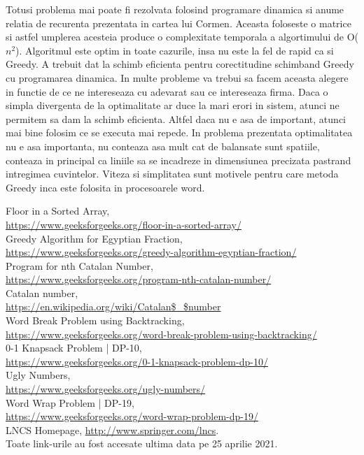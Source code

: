 \documentclass[runningheads]{llncs}
\begin{document}
Totusi problema mai poate fi rezolvata folosind programare dinamica si anume relatia de recurenta prezentata in
cartea lui Cormen. Aceasta foloseste o matrice si astfel umplerea acesteia produce o complexitate temporala a algortimului de O($n^2$).
Algoritmul este optim in toate cazurile, insa nu este la fel de rapid ca si Greedy. A trebuit dat la schimb
eficienta pentru corectitudine schimband Greedy cu programarea dinamica. In multe probleme va trebui sa facem
aceasta alegere in functie de ce ne intereseaza cu adevarat sau ce intereseaza firma. Daca o simpla divergenta
de la optimalitate ar duce la mari erori in sistem, atunci ne permitem sa dam la schimb eficienta. Altfel
daca nu e asa de important, atunci mai bine folosim ce se executa mai repede. In problema prezentata optimalitatea
nu e asa importanta, nu conteaza asa mult cat de balansate sunt spatiile, conteaza in principal ca liniile sa se incadreze
in dimensiunea precizata pastrand intregimea cuvintelor. Viteza si simplitatea sunt motivele pentru care metoda Greedy inca este folosita in procesoarele word.
\begin{thebibliography}{6}
	Floor in a Sorted Array, \\
	\url{https://www.geeksforgeeks.org/floor-in-a-sorted-array/} \\
	Greedy Algorithm for Egyptian Fraction, \\
	\url{https://www.geeksforgeeks.org/greedy-algorithm-egyptian-fraction/} \\
	Program for nth Catalan Number, \\
	\url{https://www.geeksforgeeks.org/program-nth-catalan-number/} \\
	Catalan number, \\
	\url{https://en.wikipedia.org/wiki/Catalan$\_$number} \\
	Word Break Problem using Backtracking, \\
	\url{https://www.geeksforgeeks.org/word-break-problem-using-backtracking/} \\
	0-1 Knapsack Problem | DP-10, \\
	\url{https://www.geeksforgeeks.org/0-1-knapsack-problem-dp-10/} \\
	Ugly Numbers, \\
	\url{https://www.geeksforgeeks.org/ugly-numbers/} \\
	Word Wrap Problem | DP-19, \\
	\url{https://www.geeksforgeeks.org/word-wrap-problem-dp-19/} \\
	LNCS Homepage, \url{http://www.springer.com/lncs}.  \\

	Toate link-urile au fost accesate ultima data pe 25 aprilie 2021.
\end{thebibliography}
\end{document}
